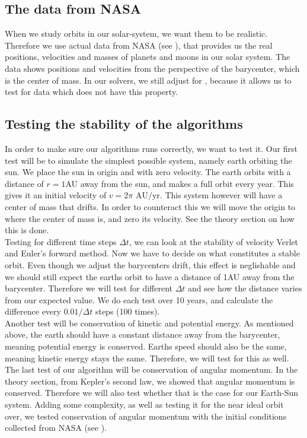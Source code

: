 \documentclass[reprint, english,notitlepage,nofootinbib]{revtex4-1}  %
\begin{document}
\subsection{The data from NASA}
When we study orbits in our solar-system, we want them to be realistic. Therefore we use actual data from NASA (see \citep{NASA}), that provides us the real positions, velocities and masses of planets and moons in our solar system. The data shows positions and velocities from the perspective of the barycenter, which is the center of mass. In our solvers, we still adjust for , because it allows us to test for data which does not have this property. 

\subsection{Testing the stability of the algorithms}
In order to make sure our algorithms runs correctly, we want to test it. Our first test will be to simulate the simplest possible system, namely earth orbiting the sun. We place the sun in origin and with zero velocity. The earth orbits with a distance of $r=1$AU away from the sun, and makes a full orbit every year. This gives it an initial velocity of $v = 2\pi \text{ AU}/\text{yr}.$ This system however will have a center of mass that drifts. In order to counteract this we will move the origin to where the center of mass is, and zero its velocity. See the theory section on how this is done.
\\
Testing for different time steps $\Delta t$, we can look at the stability of velocity Verlet and Euler's forward method. Now we have to decide on what constitutes a stable orbit. Even though we adjust the barycenters drift, this effect is neglishable and we should still expect the earths orbit to have a distance of 1AU away from the barycenter. Therefore we will test for different $\Delta t$ and see how the distance varies from our expected value. We do each test over 10 years, and calculate the difference every $0.01/\Delta t$ steps (100 times).
\\
Another test will be conservation of kinetic and potential energy. As mentioned above, the earth should have a constant distance away from the barycenter, meaning potential energy is conserved. Earths speed should also be the same, meaning kinetic energy stays the same. Therefore, we will test for this as well. 
\\
The last test of our algorithm will be conservation of angular momentum. In the theory section, from Kepler's second law, we showed that angular momentum is conserved. Therefore we will also test whether that is the case for our Earth-Sun system. Adding some complexity, as well as testing it for the near ideal orbit over, we tested conservation of angular momentum with the initial conditions collected from NASA (see \citep{NASA}).
\end{document}
